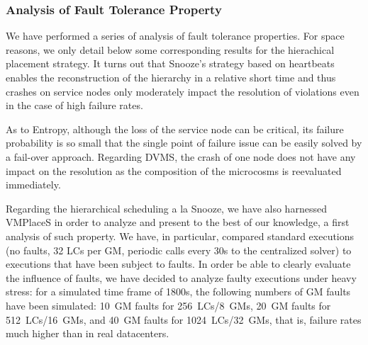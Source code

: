 

\subsubsection{Analysis of Fault Tolerance Property}
\label{subsubsec:node-crashes}
We have performed a series of analysis of fault tolerance
properties. For space reasons, we only detail below some corresponding
results for the hierachical placement strategy. It turns out that
Snooze's strategy based on heartbeats enables the reconstruction of
the hierarchy in a relative short time and thus crashes on service
nodes only moderately impact the resolution of violations even in the
case of high failure rates.

As to Entropy, although the loss of the service node can be critical,
its failure probability is so small that the single point of failure
issue can be easily solved by a fail-over approach.  Regarding DVMS,
the crash of one node does not have any impact on the resolution as
the composition of the microcosms is reevaluated immediately.



Regarding the hierarchical scheduling a la Snooze, we have also
harnessed VMPlaceS in order to analyze and present to the best of our
knowledge, a first analysis of such property.
We have, in particular, compared standard executions (no faults, 32
LCs per GM, periodic calls every 30s to the centralized solver) to
executions that have been subject to faults. In order be able to
clearly evaluate the influence of faults, we have decided to analyze
faulty executions under heavy stress: for a simulated time frame of
1800s, the following numbers of GM faults have been simulated: 10~GM
faults for 256~LCs/8~GMs, 20~GM faults for 512~LCs/16~GMs, and 40~GM
faults for 1024~LCs/32~GMs, that is, failure rates much higher than in
real datacenters.


